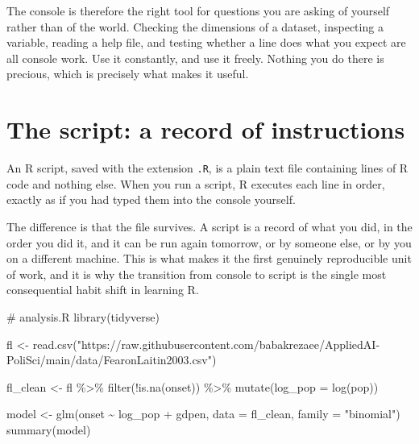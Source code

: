 \documentclass[
  a4paper,
]{scrbook}
\newenvironment{Shaded}{\begin{snugshade}}{\end{snugshade}}
\newcommand{\AttributeTok}[1]{\textcolor[rgb]{0.40,0.45,0.13}{#1}}
\newcommand{\CommentTok}[1]{\textcolor[rgb]{0.37,0.37,0.37}{#1}}
\newcommand{\FunctionTok}[1]{\textcolor[rgb]{0.28,0.35,0.67}{#1}}
\newcommand{\NormalTok}[1]{\textcolor[rgb]{0.00,0.23,0.31}{#1}}
\newcommand{\OtherTok}[1]{\textcolor[rgb]{0.00,0.23,0.31}{#1}}
\newcommand{\SpecialCharTok}[1]{\textcolor[rgb]{0.37,0.37,0.37}{#1}}
\newcommand{\StringTok}[1]{\textcolor[rgb]{0.13,0.47,0.30}{#1}}
\begin{document}
The console is therefore the right tool for questions you are asking of
yourself rather than of the world. Checking the dimensions of a dataset,
inspecting a variable, reading a help file, and testing whether a line
does what you expect are all console work. Use it constantly, and use it
freely. Nothing you do there is precious, which is precisely what makes
it useful.

\section*{The script: a record of
instructions}\label{the-script-a-record-of-instructions}


An R script, saved with the extension \texttt{.R}, is a plain text file
containing lines of R code and nothing else. When you run a script, R
executes each line in order, exactly as if you had typed them into the
console yourself.

The difference is that the file survives. A script is a record of what
you did, in the order you did it, and it can be run again tomorrow, or
by someone else, or by you on a different machine. This is what makes it
the first genuinely reproducible unit of work, and it is why the
transition from console to script is the single most consequential habit
shift in learning R.

\begin{Shaded}
\begin{Highlighting}[]
\CommentTok{\# analysis.R}
\FunctionTok{library}\NormalTok{(tidyverse)}

\NormalTok{fl }\OtherTok{\textless{}{-}} \FunctionTok{read.csv}\NormalTok{(}\StringTok{"https://raw.githubusercontent.com/babakrezaee/AppliedAI{-}PoliSci/main/data/FearonLaitin2003.csv"}\NormalTok{)}

\NormalTok{fl\_clean }\OtherTok{\textless{}{-}}\NormalTok{ fl }\SpecialCharTok{\%\textgreater{}\%}
  \FunctionTok{filter}\NormalTok{(}\SpecialCharTok{!}\FunctionTok{is.na}\NormalTok{(onset)) }\SpecialCharTok{\%\textgreater{}\%}
  \FunctionTok{mutate}\NormalTok{(}\AttributeTok{log\_pop =} \FunctionTok{log}\NormalTok{(pop))}

\NormalTok{model }\OtherTok{\textless{}{-}} \FunctionTok{glm}\NormalTok{(onset }\SpecialCharTok{\textasciitilde{}}\NormalTok{ log\_pop }\SpecialCharTok{+}\NormalTok{ gdpen, }\AttributeTok{data =}\NormalTok{ fl\_clean, }\AttributeTok{family =} \StringTok{"binomial"}\NormalTok{)}
\FunctionTok{summary}\NormalTok{(model)}
\end{Highlighting}
\end{Shaded}
\end{document}
